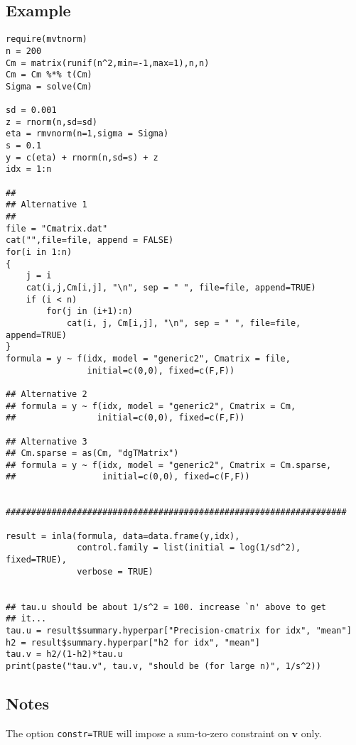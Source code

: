 \documentclass[a4paper,11pt]{article}
\def\mm#1{\ensuremath{\boldsymbol{#1}}} %
\begin{document}
\subsection*{Example}
{\small\begin{verbatim}
require(mvtnorm)
n = 200
Cm = matrix(runif(n^2,min=-1,max=1),n,n)
Cm = Cm %*% t(Cm)
Sigma = solve(Cm)

sd = 0.001
z = rnorm(n,sd=sd)
eta = rmvnorm(n=1,sigma = Sigma)
s = 0.1
y = c(eta) + rnorm(n,sd=s) + z
idx = 1:n

##
## Alternative 1
##
file = "Cmatrix.dat"
cat("",file=file, append = FALSE)
for(i in 1:n)
{
    j = i
    cat(i,j,Cm[i,j], "\n", sep = " ", file=file, append=TRUE)
    if (i < n)
        for(j in (i+1):n)
            cat(i, j, Cm[i,j], "\n", sep = " ", file=file, append=TRUE)
}
formula = y ~ f(idx, model = "generic2", Cmatrix = file,
                initial=c(0,0), fixed=c(F,F))

## Alternative 2
## formula = y ~ f(idx, model = "generic2", Cmatrix = Cm,
##                initial=c(0,0), fixed=c(F,F))

## Alternative 3
## Cm.sparse = as(Cm, "dgTMatrix")
## formula = y ~ f(idx, model = "generic2", Cmatrix = Cm.sparse,
##                 initial=c(0,0), fixed=c(F,F))


###################################################################

result = inla(formula, data=data.frame(y,idx),
              control.family = list(initial = log(1/sd^2), fixed=TRUE),
              verbose = TRUE)


## tau.u should be about 1/s^2 = 100. increase `n' above to get
## it...
tau.u = result$summary.hyperpar["Precision-cmatrix for idx", "mean"]
h2 = result$summary.hyperpar["h2 for idx", "mean"]
tau.v = h2/(1-h2)*tau.u
print(paste("tau.v", tau.v, "should be (for large n)", 1/s^2))
\end{verbatim}}

\subsection*{Notes}

The option \texttt{constr=TRUE} will impose a sum-to-zero constraint
on $\mm{v}$ only.
\end{document}
